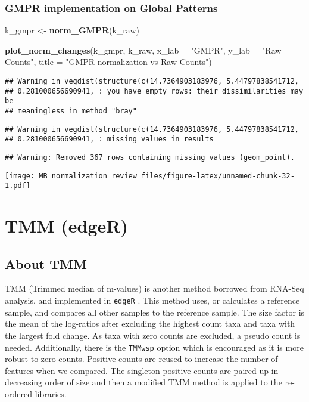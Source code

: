 \documentclass[
]{book}
\newenvironment{Shaded}{\begin{snugshade}}{\end{snugshade}}
\newcommand{\DataTypeTok}[1]{\textcolor[rgb]{0.13,0.29,0.53}{#1}}
\newcommand{\KeywordTok}[1]{\textcolor[rgb]{0.13,0.29,0.53}{\textbf{#1}}}
\newcommand{\NormalTok}[1]{#1}
\newcommand{\StringTok}[1]{\textcolor[rgb]{0.31,0.60,0.02}{#1}}
\begin{document}
\hypertarget{gmpr-implementation-on-global-patterns-1}{%
\subsubsection{GMPR implementation on Global Patterns}\label{gmpr-implementation-on-global-patterns-1}}

\begin{Shaded}
\begin{Highlighting}[]
\NormalTok{k\_gmpr \textless{}{-}}\StringTok{ }\KeywordTok{norm\_GMPR}\NormalTok{(k\_raw)}

\KeywordTok{plot\_norm\_changes}\NormalTok{(k\_gmpr, k\_raw,}
                  \DataTypeTok{x\_lab =} \StringTok{"GMPR"}\NormalTok{, }\DataTypeTok{y\_lab =} \StringTok{"Raw Counts"}\NormalTok{,}
                  \DataTypeTok{title =} \StringTok{"GMPR normalization vs Raw Counts"}\NormalTok{)}
\end{Highlighting}
\end{Shaded}

\begin{verbatim}
## Warning in vegdist(structure(c(14.7364903183976, 5.44797838541712,
## 0.281000656690941, : you have empty rows: their dissimilarities may be
## meaningless in method "bray"
\end{verbatim}

\begin{verbatim}
## Warning in vegdist(structure(c(14.7364903183976, 5.44797838541712,
## 0.281000656690941, : missing values in results
\end{verbatim}

\begin{verbatim}
## Warning: Removed 367 rows containing missing values (geom_point).
\end{verbatim}

\texttt{[image: MB\_normalization\_review\_files/figure-latex/unnamed-chunk-32-1.pdf]}

\hypertarget{tmm-edger}{%
\section{TMM (edgeR)}\label{tmm-edger}}

\hypertarget{about-tmm}{%
\subsection{About TMM}\label{about-tmm}}

TMM (Trimmed median of m-values) is another method borrowed from RNA-Seq analysis, and implemented in \texttt{edgeR} \citep{robinson2010}. This method uses, or calculates a reference sample, and compares all other samples to the reference sample. The size factor is the mean of the log-ratios after excluding the highest count taxa and taxa with the largest fold change. As taxa with zero counts are excluded, a pseudo count is needed. Additionally, there is the \texttt{TMMwsp} option which is encouraged as it is more robust to zero counts. Positive counts are reused to increase the number of features when we compared. The singleton positive counts are paired up in decreasing order of size and then a modified TMM method is applied to the re-ordered libraries.
\end{document}
